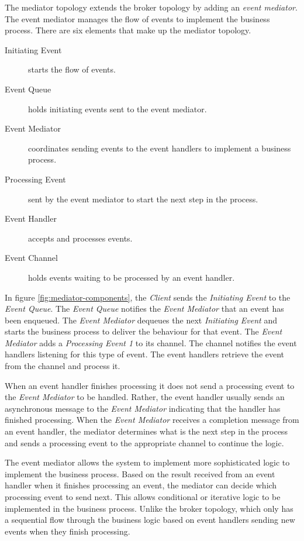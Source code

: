 The mediator topology extends the broker topology by adding an \emph{event mediator}.
The event mediator manages the flow of events to implement the business process.
There are six elements that make up the mediator topology.

\begin{description}
    \item[Initiating Event] starts the flow of events.
    \item[Event Queue] holds initiating events sent to the event mediator.
    \item[Event Mediator] coordinates sending events to the event handlers to implement a business process.
    \item[Processing Event] sent by the event mediator to start the next step in the process.
    \item[Event Handler] accepts and processes events.
    \item[Event Channel] holds events waiting to be processed by an event handler.
\end{description}

In figure \ref{fig:mediator-components}, the \emph{Client} sends the \emph{Initiating Event} to the \emph{Event Queue}.
The \emph{Event Queue} notifies the \emph{Event Mediator} that an event has been enqueued.
The \emph{Event Mediator} dequeues the next \emph{Initiating Event} and starts the business process to deliver the behaviour for that event.
The \emph{Event Mediator} adds a \emph{Processing Event 1} to its channel.
The channel notifies the event handlers listening for this type of event.
The event handlers retrieve the event from the channel and process it.

When an event handler finishes processing it does not send a processing event to the \emph{Event Mediator} to be handled.
Rather, the event handler usually sends an asynchronous message to the \emph{Event Mediator} indicating that the handler has finished processing.
When the \emph{Event Mediator} receives a completion message from an event handler,
the mediator determines what is the next step in the process and sends a processing event to the appropriate channel to continue the logic.

The event mediator allows the system to implement more sophisticated logic to implement the business process.
Based on the result received from an event handler when it finishes processing an event,
the mediator can decide which processing event to send next.
This allows conditional or iterative logic to be implemented in the business process.
Unlike the broker topology, which only has a sequential flow through the business logic based on event handlers sending new events when they finish processing.

